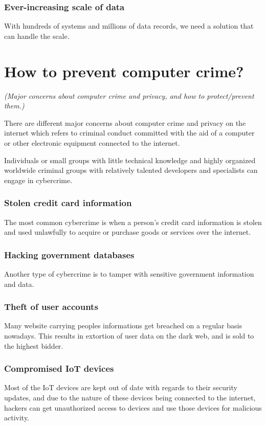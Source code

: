 \documentclass[twocolumn, 12pt, a4paper]{article}
\begin{document}
\subsubsection{Ever-increasing scale of data}
With hundreds of systems and millions of data records, we need a solution that
can handle the scale.

\section{How to prevent computer crime?}
\begin{center}
  \emph{(Major concerns about computer crime and privacy, and how to
  protect/prevent them.)}
\end{center}
There are different major concerns about computer crime and privacy on the
internet which refers to criminal conduct committed with the aid of a computer
or other electronic equipment connected to the internet.

Individuals or small groups with little technical knowledge and highly
organized worldwide criminal groups with relatively talented developers and 
specialists can engage in cybercrime.

\subsubsection{Stolen credit card information}
The most common cybercrime is when a person's credit card information is
stolen and used unlawfully to acquire or purchase goods or services over the
internet.
\subsubsection{Hacking government databases}
Another type of cybercrime is to tamper with sensitive government information
and data.
\subsubsection{Theft of user accounts}
Many website carrying peoples informations get breached on a regular basis 
nowadays. This results in extortion of user data on the dark web, and is sold 
to the highest bidder.
\subsubsection{Compromised IoT devices}
Most of the IoT devices are kept out of date with regards to their security 
updates, and due to the nature of these devices being connected to the
internet, hackers can get unauthorized access to devices and use those devices
for malicious activity.
\end{document}

